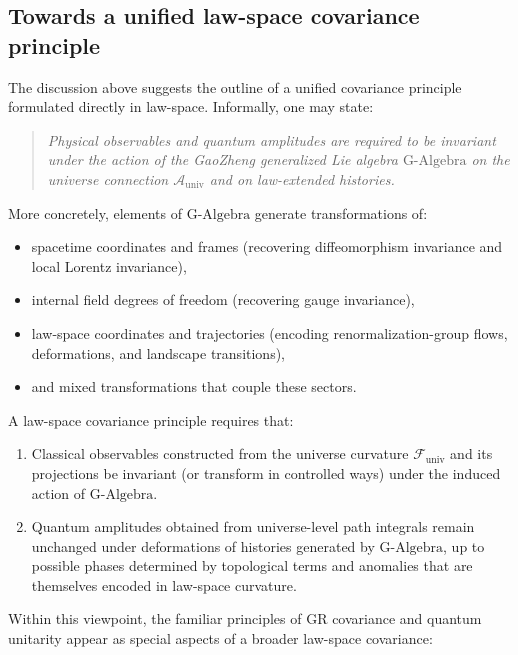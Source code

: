 \documentclass[11pt]{book}
\newcommand{\GAlgebra}{\text{G-Algebra}}
\theoremstyle{plain}
\theoremstyle{definition}
\theoremstyle{remark}
\begin{document}
\subsection{Towards a unified law-space covariance principle}
\label{subsec:lawspace-covariance}


The discussion above suggests the outline of a unified covariance
principle formulated directly in law-space. Informally, one may
state:

\begin{quote}
  \emph{Physical observables and quantum amplitudes are required to
  be invariant under the action of the GaoZheng generalized Lie
  algebra $\GAlgebra$ on the universe connection
  $\mathcal{A}_{\mathrm{univ}}$ and on law-extended histories.}
\end{quote}

More concretely, elements of $\GAlgebra$ generate transformations of:
\begin{itemize}
  \item spacetime coordinates and frames (recovering diffeomorphism
        invariance and local Lorentz invariance),
  \item internal field degrees of freedom (recovering gauge
        invariance),
  \item law-space coordinates and trajectories (encoding
        renormalization-group flows, deformations, and landscape
        transitions),
  \item and mixed transformations that couple these sectors.
\end{itemize}

A law-space covariance principle requires that:

\begin{enumerate}
  \item Classical observables constructed from the universe
        curvature $\mathcal{F}_{\mathrm{univ}}$ and its projections
        be invariant (or transform in controlled ways) under the
        induced action of $\GAlgebra$.
  \item Quantum amplitudes obtained from universe-level path
        integrals remain unchanged under deformations of histories
        generated by $\GAlgebra$, up to possible phases determined
        by topological terms and anomalies that are themselves
        encoded in law-space curvature.
\end{enumerate}

Within this viewpoint, the familiar principles of GR covariance and
quantum unitarity appear as special aspects of a broader law-space
covariance:
\end{document}
